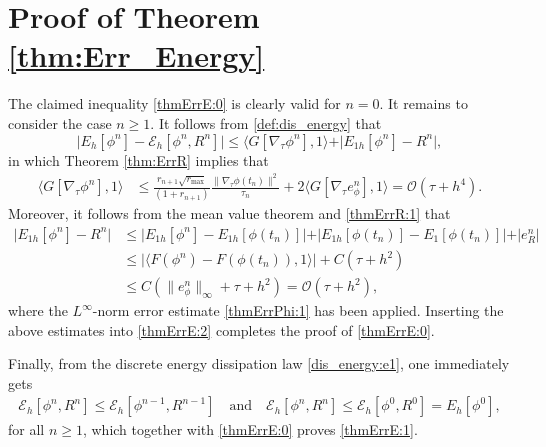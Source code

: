 \documentclass{m2an}
\newcommand{\mo}{\mathcal{O}}
\begin{document}
\section{Proof of Theorem \ref{thm:Err_Energy}}\label{App:A}
\setcounter{equation}{0}
\renewcommand\theequation{C.\arabic{equation}}
The claimed inequality \eqref{thmErrE:0} is clearly valid for $n=0$. It remains to consider the case $ n \geq 1 $. It follows from \eqref{def:dis_energy} that
\begin{equation}\label{thmErrE:2}
	\vert E_h[\phi^{n}] - \mathcal{E}_h[\phi^{n}, R^{n}] \vert \leq \langle G[ \nabla_{\tau} \phi^{n} ], 1 \rangle + \vert  E_{1h}[ \phi^{n} ] - R^n \vert,
\end{equation}
in which  Theorem \ref{thm:ErrR} implies that
\begin{equation*}\label{thmErrE:3}
	\begin{aligned}
		\langle G[ \nabla_{\tau} \phi^{n} ], 1 \rangle 
		& \leq \frac{r_{n+1} \sqrt{r_{\max }}}{\left(1+r_{n+1}\right)} \frac{ \| \nabla_{\tau} \phi( t_{n} ) \|^{2} }{\tau_n} + 2 \big\langle G[ \nabla_{\tau} e_\phi^{n} ], 1 \big\rangle  =\mo ( \tau + h^4 ).
	\end{aligned}
\end{equation*}
Moreover, it follows from the mean value theorem and \eqref{thmErrR:1} that
\begin{equation*}\label{thmErrE:4}
	\begin{aligned}
		\vert  E_{1h}[ \phi^{n} ] - R^n \vert & \leq \vert  E_{1h}[ \phi^{n} ] - E_{1h}[ \phi ( t_{n} ) ] \vert + \vert  E_{1h}[ \phi ( t_{n} ) ] - E_1[ \phi ( t_{n} ) ] \vert + \vert e_{R}^{n} \vert \\
		& \leq \vert  \langle F(\phi^n) - F( \phi( t_{n} ) ), 1 \rangle \vert + C ( \tau + h^2 ) \\
		& \leq C  ( \| e_{\phi}^{n} \|_{\infty} + \tau + h^2 ) =\mo ( \tau + h^2 ),
	\end{aligned}
\end{equation*}
where the $L^{\infty}$-norm error estimate \eqref{thmErrPhi:1} has been applied. Inserting the above estimates into \eqref{thmErrE:2} completes the proof of \eqref{thmErrE:0}.

Finally, from the discrete energy dissipation law \eqref{dis_energy:e1}, one immediately gets
\begin{equation*}
	\begin{aligned}
		\mathcal{E}_h[\phi^{n}, R^{n}] \leq \mathcal{E}_h[\phi^{n-1}, R^{n-1}] \quad \text{and} \quad \mathcal{E}_h[\phi^{n}, R^{n}] \leq \mathcal{E}_h[\phi^{0}, R^{0}] = E_h[\phi^{0}],
	\end{aligned}
\end{equation*}
for all $ n \ge 1$, which together with \eqref{thmErrE:0} proves \eqref{thmErrE:1}.



\end{document}

